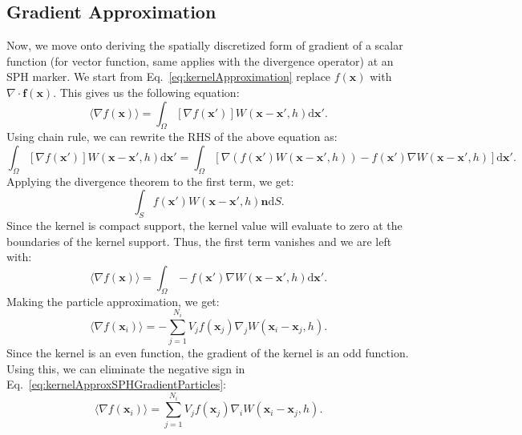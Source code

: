 \documentclass{article}
\newcommand{\vx}{\mathbf{x}}
\newcommand{\vn}{\mathbf{n}}
\newcommand{\dd}{\mathrm{d}}
\begin{document}
\subsection*{Gradient Approximation}
Now, we move onto deriving the spatially discretized form of gradient of a scalar function (for vector function, same applies with the divergence operator) at an SPH marker. We start from Eq.~\ref{eq:kernelApproximation} replace $f(\vx)$ with $\nabla \cdot \mathbf{f}(\vx)$. This gives us the following equation:
\begin{equation}
    \label{eq:SimplekernelApproxSPHGradient}
    \langle \nabla f(\vx) \rangle = \int_\Omega \left[ \nabla f(\vx') \right] W(\vx - \vx', h) \dd{\vx'}.
\end{equation}
Using chain rule, we can rewrite the RHS of the above equation as:
\begin{equation}
    \int_\Omega \left[ \nabla f(\vx') \right] W(\vx - \vx', h) \dd{\vx'} = \int_\Omega \left[ \nabla \left( f(\vx') W(\vx - \vx', h) \right) - f(\vx') \nabla W(\vx - \vx', h) \right] \dd{\vx'}.
\end{equation}
Applying the divergence theorem to the first term, we get:
\begin{equation}
    \int_{S} f(\vx') W(\vx - \vx', h)\vn \dd{S}.
\end{equation}
Since the kernel is compact support, the kernel value will evaluate to zero at the boundaries of the kernel support. Thus, the first term vanishes and we are left with:
\begin{equation}
    \label{eq:kernelApproxSPHGradient}
    \langle \nabla f(\vx) \rangle = \int_\Omega - f(\vx') \nabla W(\vx - \vx', h) \dd{\vx'}.
\end{equation}
Making the particle approximation, we get:
\begin{equation}
    \label{eq:kernelApproxSPHGradientParticles}
    \langle \nabla f(\vx_i) \rangle = - \sum_{j=1}^{N_i} V_j f(\vx_j) \nabla_j W(\vx_i - \vx_j, h).
\end{equation}
Since the kernel is an even function, the gradient of the kernel is an odd function. Using this, we can eliminate the negative sign in Eq.~\ref{eq:kernelApproxSPHGradientParticles}:
\begin{equation}
    \label{eq:kernelApproxSPHGradientParticlesPositive}
    \langle \nabla f(\vx_i) \rangle = \sum_{j=1}^{N_i} V_j f(\vx_j) \nabla_i W(\vx_i - \vx_j, h).
\end{equation}
\end{document}
